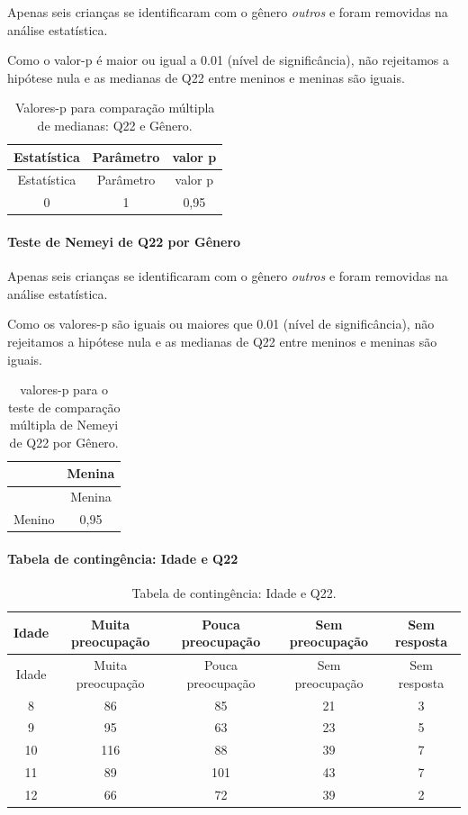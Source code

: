 \documentclass[]{article}
\let\oldparagraph\paragraph
\renewcommand{\paragraph}[1]{\oldparagraph{#1}\mbox{}}
\begin{document}
Apenas seis crianças se identificaram com o gênero \emph{outros} e foram removidas na análise estatística.

Como o valor-p é maior ou igual a 0.01 (nível de significância), não rejeitamos a hipótese nula e as medianas de Q22 entre meninos e meninas são iguais.

\begin{longtable}[]{@{}ccc@{}}
\caption{\label{tab:unnamed-chunk-501}Valores-p para comparação múltipla de medianas: Q22 e Gênero.}\tabularnewline
\toprule
Estatística & Parâmetro & valor p\tabularnewline
\midrule
\endfirsthead
\toprule
Estatística & Parâmetro & valor p\tabularnewline
\midrule
\endhead
0 & 1 & 0,95\tabularnewline
\bottomrule
\end{longtable}

\hypertarget{teste-de-nemeyi-de-q22-por-guxeanero}{%
\paragraph{Teste de Nemeyi de Q22 por Gênero}\label{teste-de-nemeyi-de-q22-por-guxeanero}}

Apenas seis crianças se identificaram com o gênero \emph{outros} e foram removidas na análise estatística.

Como os valores-p são iguais ou maiores que 0.01 (nível de significância), não rejeitamos a hipótese nula e as medianas de Q22 entre meninos e meninas são iguais.

\begin{longtable}[]{@{}lc@{}}
\caption{\label{tab:unnamed-chunk-503}valores-p para o teste de comparação múltipla de Nemeyi de Q22 por Gênero.}\tabularnewline
\toprule
& Menina\tabularnewline
\midrule
\endfirsthead
\toprule
& Menina\tabularnewline
\midrule
\endhead
Menino & 0,95\tabularnewline
\bottomrule
\end{longtable}

\cleardoublepage

\hypertarget{tabela-de-continguxeancia-idade-e-q22}{%
\paragraph{Tabela de contingência: Idade e Q22}\label{tabela-de-continguxeancia-idade-e-q22}}

\begin{longtable}[]{@{}ccccc@{}}
\caption{\label{tab:unnamed-chunk-504}Tabela de contingência: Idade e Q22.}\tabularnewline
\toprule
Idade & Muita preocupação & Pouca preocupação & Sem preocupação & Sem resposta\tabularnewline
\midrule
\endfirsthead
\toprule
Idade & Muita preocupação & Pouca preocupação & Sem preocupação & Sem resposta\tabularnewline
\midrule
\endhead
8 & 86 & 85 & 21 & 3\tabularnewline
9 & 95 & 63 & 23 & 5\tabularnewline
10 & 116 & 88 & 39 & 7\tabularnewline
11 & 89 & 101 & 43 & 7\tabularnewline
12 & 66 & 72 & 39 & 2\tabularnewline
\bottomrule
\end{longtable}
\end{document}
